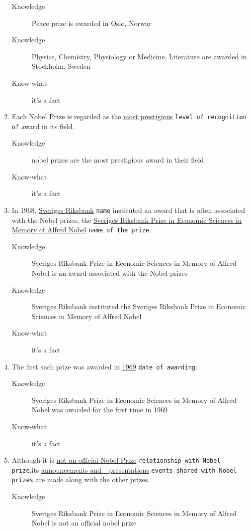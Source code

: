 \documentclass[a4paper,10pt,twoside,twocolumn]{article}
\begin{document}
\begin{enumerate}
\begin{description}
\item[{Knowledge}] Peace prize is awarded in Oslo, Norway
\item[{Knowledge}] Physics, Chemistry, Physiology or Medicine, Literature are awarded in Stockholm, Sweden
\item[{Know-what}] it's a fact
\end{description}
\item Each Nobel Prize is regarded as the \uline{most prestigious} \texttt{level of recognition of} award  in its field.
\begin{description}
\item[{Knowledge}] nobel prizes are the most prestigious award in their field
\item[{Know-what}] it's a fact
\end{description}
\item In 1968, \uline{Sveriges Riksbank} \texttt{name} instituted an award that is often associated with the Nobel prizes, the \uline{Sveriges Riksbank Prize in Economic Sciences in Memory of Alfred Nobel} \texttt{name of the prize}.
\begin{description}
\item[{Knowledge}] Sveriges Riksbank Prize in Economic Sciences in Memory of Alfred Nobel is an award associated with the Nobel prizes
\item[{Knowledge}] Sveriges Riksbank instituted the Sveriges Riksbank Prize in Economic Sciences in Memory of Alfred Nobel
\item[{Know-what}] it's a fact
\end{description}
\item The first such prize was awarded in \uline{1969} \texttt{date of awarding}.
\begin{description}
\item[{Knowledge}] Sveriges Riksbank Prize in Economic Sciences in Memory of Alfred Nobel was awarded for the first time in 1969
\item[{Know-what}] it's a fact
\end{description}
\item Although it is \uline{not an official Nobel Prize} \texttt{relationship with Nobel prize},its \uline{announcements and \_presentations} \texttt{events shared with Nobel prizes} are made along with the other prizes.
\begin{description}
\item[{Knowledge}] Sveriges Riksbank Prize in Economic Sciences in Memory of Alfred Nobel is not an official nobel prize

\end{description}
\end{enumerate}
\end{document}
